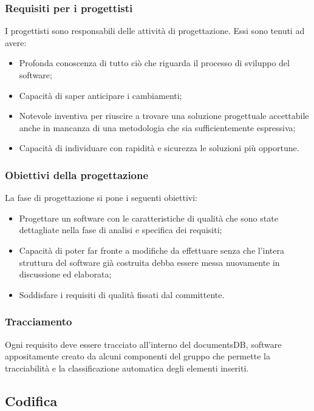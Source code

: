 \subsubsection{Requisiti per i progettisti}

I progettisti sono responsabili delle attività di progettazione. Essi sono tenuti ad avere:
\begin{itemize} 
\item
Profonda conoscenza di tutto ciò che riguarda il processo di sviluppo del software;
\item
Capacità di saper anticipare i cambiamenti;
\item
Notevole inventiva per riuscire a trovare una soluzione progettuale accettabile anche in mancanza di una metodologia che sia sufficientemente espressiva;
\item
Capacità di individuare con rapidità e sicurezza le soluzioni più opportune.
\end{itemize}

\subsubsection{Obiettivi della progettazione}
La fase di progettazione si pone i seguenti obiettivi:
\begin{itemize} 
\item
Progettare un software con le caratteristiche di qualità che sono state dettagliate nella fase di analisi e specifica dei requisiti;
\item
Capacità di poter far fronte a modifiche da effettuare senza che l'intera struttura del software già costruita debba essere messa nuovamente in discussione ed elaborata;
\item
Soddisfare i requisiti di qualità fissati dal committente.
\end{itemize}

\subsubsection{Tracciamento}
Ogni requisito deve essere tracciato all'interno del documentsDB, software
appositamente creato da alcuni componenti del gruppo che permette la tracciabilità e la classificazione automatica degli elementi inseriti.

\subsection{Codifica}

